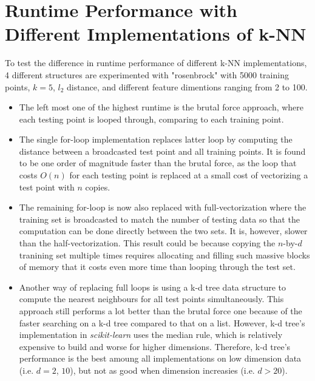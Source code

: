 \documentclass{article} %
\begin{document}
\vspace{0.4cm}
\section*{Runtime Performance with Different Implementations of k-NN} %

To test the difference in runtime performance of different k-NN implementations, 4 different structures are experimented with "rosenbrock" with 5000 training points, $k=5$, $l_2$ distance, and different feature dimentions ranging from 2 to 100.

\begin{itemize}
  \item The left most one of the highest runtime is the brutal force approach, where each testing point is looped through, comparing to each training point.

  \item The single for-loop implementation replaces latter loop by computing the distance between a broadcasted test point and all training points. It is found to be one order of magnitude faster than the brutal force, as the loop that costs $O(n)$ for each testing point is replaced at a small cost of vectorizing a test point with $n$ copies.
\end{itemize}

\begin{itemize}
  \item The remaining for-loop is now also replaced with full-vectorization where the training set is broadcasted to match the number of testing data so that the computation can be done directly between the two sets. It is, however, slower than the half-vectorization. This result could be because copying the $n$-by-$d$ tranining set multiple times requires allocating and filling such massive blocks of memory that it costs even more time than looping through the test set.

  \item Another way of replacing full loops is using a k-d tree data structure to compute the nearest neighbours for all test points simultaneously. This approach still performs a lot better than the brutal force one because of the faster searching on a k-d tree compared to that on a list. However, k-d tree's implementation in \textit{scikit-learn} uses the median rule, which is relatively expensive to build and worse for higher dimensions. Therefore, k-d tree's performance is the best amoung all implementations on low dimension data (i.e. $d=2$, $10$), but not as good when dimension increasies (i.e. $d>20$).
\end{itemize}
\end{document}
